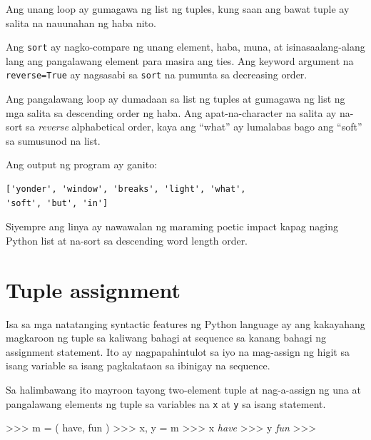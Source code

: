 \documentclass[10pt,]{book}
\newenvironment{Shaded}{}{}
\newcommand{\CommentTok}[1]{\textcolor[rgb]{0.38,0.63,0.69}{\textit{#1}}}
\newcommand{\NormalTok}[1]{#1}
\newcommand{\OperatorTok}[1]{\textcolor[rgb]{0.40,0.40,0.40}{#1}}
\newcommand{\StringTok}[1]{\textcolor[rgb]{0.25,0.44,0.63}{#1}}
\begin{document}
Ang unang loop ay gumagawa ng list ng tuples, kung saan ang bawat tuple
ay salita na nauunahan ng haba nito.

Ang \texttt{sort} ay nagko-compare ng unang element, haba, muna, at
isinasaalang-alang lang ang pangalawang element para masira ang ties.
Ang keyword argument na \texttt{reverse=True} ay nagsasabi sa
\texttt{sort} na pumunta sa decreasing order.

  

Ang pangalawang loop ay dumadaan sa list ng tuples at gumagawa ng list
ng mga salita sa descending order ng haba. Ang apat-na-character na
salita ay na-sort sa \emph{reverse} alphabetical order, kaya ang
``what'' ay lumalabas bago ang ``soft'' sa sumusunod na list.

Ang output ng program ay ganito:

{\small
\begin{verbatim}
['yonder', 'window', 'breaks', 'light', 'what',
'soft', 'but', 'in']
\end{verbatim}
}

Siyempre ang linya ay nawawalan ng maraming poetic impact kapag naging
Python list at na-sort sa descending word length order.

\section{Tuple assignment}\label{tuple-assignment}

  

Isa sa mga natatanging syntactic features ng Python language ay ang
kakayahang magkaroon ng tuple sa kaliwang bahagi at sequence sa kanang
bahagi ng assignment statement. Ito ay nagpapahintulot sa iyo na
mag-assign ng higit sa isang variable sa isang pagkakataon sa ibinigay
na sequence.

Sa halimbawang ito mayroon tayong two-element tuple at nag-a-assign ng
una at pangalawang elements ng tuple sa variables na \texttt{x} at
\texttt{y} sa isang statement.

\begin{Shaded}
\begin{Highlighting}[]
\OperatorTok{\textgreater{}\textgreater{}\textgreater{}}\NormalTok{ m }\OperatorTok{=}\NormalTok{ ( }\StringTok{\textquotesingle{}have\textquotesingle{}}\NormalTok{, }\StringTok{\textquotesingle{}fun\textquotesingle{}}\NormalTok{ )}
\OperatorTok{\textgreater{}\textgreater{}\textgreater{}}\NormalTok{ x, y }\OperatorTok{=}\NormalTok{ m}
\OperatorTok{\textgreater{}\textgreater{}\textgreater{}}\NormalTok{ x}
\CommentTok{\textquotesingle{}have\textquotesingle{}}
\OperatorTok{\textgreater{}\textgreater{}\textgreater{}}\NormalTok{ y}
\CommentTok{\textquotesingle{}fun\textquotesingle{}}
\OperatorTok{\textgreater{}\textgreater{}\textgreater{}}
\end{Highlighting}
\end{Shaded}
\end{document}
